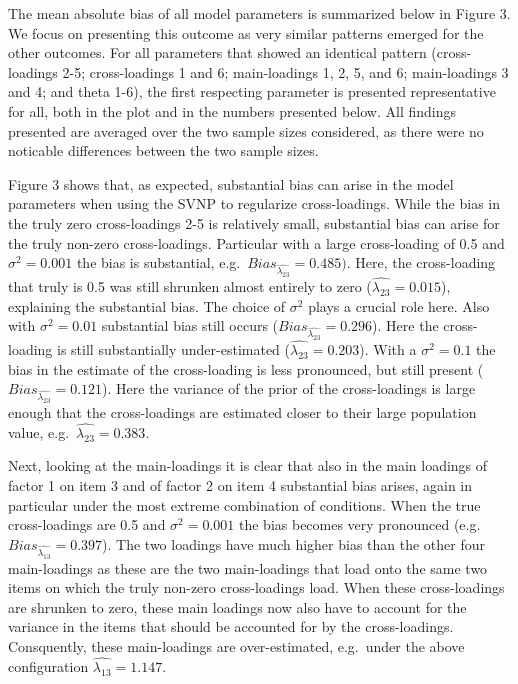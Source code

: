 \documentclass[
  english,
  man]{apa6}
\begin{document}
The mean absolute bias of all model parameters is summarized below in Figure 3. We focus on presenting this outcome as very similar patterns emerged for the other outcomes. For all parameters that showed an identical pattern (cross-loadings 2-5; cross-loadings 1 and 6; main-loadings 1, 2, 5, and 6; main-loadings 3 and 4; and theta 1-6), the first respecting parameter is presented representative for all, both in the plot and in the numbers presented below. All findings presented are averaged over the two sample sizes considered, as there were no noticable differences between the two sample sizes.

Figure 3 shows that, as expected, substantial bias can arise in the model parameters when using the SVNP to regularize cross-loadings. While the bias in the truly zero cross-loadings 2-5 is relatively small, substantial bias can arise for the truly non-zero cross-loadings. Particular with a large cross-loading of 0.5 and \(\sigma^2 = 0.001\) the bias is substantial, e.g.~\(Bias_{\hat{\lambda_{23}}} = 0.485)\). Here, the cross-loading that truly is 0.5 was still shrunken almost entirely to zero (\(\hat{\lambda_{23}} = 0.015\)), explaining the substantial bias. The choice of \(\sigma^2\) plays a crucial role here. Also with \(\sigma^2 = 0.01\) substantial bias still occurs (\(Bias_{\hat{\lambda_{23}}} = 0.296\)). Here the cross-loading is still substantially under-estimated (\(\hat{\lambda_{23}} = 0.203\)). With a \(\sigma^2 = 0.1\) the bias in the estimate of the cross-loading is less pronounced, but still present (\(Bias_{\hat{\lambda_{23}}} = 0.121\)). Here the variance of the prior of the cross-loadings is large enough that the cross-loadings are estimated closer to their large population value, e.g.~\(\hat{\lambda_{23}} = 0.383\).

Next, looking at the main-loadings it is clear that also in the main loadings of factor 1 on item 3 and of factor 2 on item 4 substantial bias arises, again in particular under the most extreme combination of conditions. When the true cross-loadings are 0.5 and \(\sigma^2 = 0.001\) the bias becomes very pronounced (e.g.~\(Bias_{\hat{\lambda_{13}}} = 0.397\)). The two loadings have much higher bias than the other four main-loadings as these are the two main-loadings that load onto the same two items on which the truly non-zero cross-loadings load. When these cross-loadings are shrunken to zero, these main loadings now also have to account for the variance in the items that should be accounted for by the cross-loadings. Consquently, these main-loadings are over-estimated, e.g.~under the above configuration \(\hat{\lambda_{13}} = 1.147\).
\end{document}
